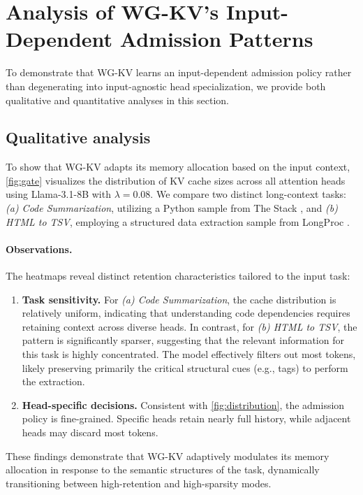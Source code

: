\section{Analysis of WG-KV's Input-Dependent Admission Patterns}
\label{app:dynamic}

To demonstrate that WG-KV learns an input-dependent admission policy rather than degenerating into input-agnostic head specialization, we provide both qualitative and quantitative analyses in this section.

\subsection{Qualitative analysis}
\label{app:qualitative}


To show that WG-KV adapts its memory allocation based on the input context, \cref{fig:gate} visualizes the distribution of KV cache sizes across all attention heads using Llama-3.1-8B with $\lambda=0.08$. We compare two distinct long-context tasks: \textit{(a) Code Summarization}, utilizing a Python sample from The Stack \cite{thestack}, and \textit{(b) HTML to TSV}, employing a structured data extraction sample from LongProc \cite{longproc}.

\paragraph{Observations.} The heatmaps reveal distinct retention characteristics tailored to the input task:
\begin{enumerate}
    \item \textbf{Task sensitivity.} For \textit{(a) Code Summarization}, the cache distribution is relatively uniform, indicating that understanding code dependencies requires retaining context across diverse heads. In contrast, for \textit{(b) HTML to TSV}, the pattern is significantly sparser, suggesting that the relevant information for this task is highly concentrated. The model effectively filters out most tokens, likely preserving primarily the critical structural cues (e.g., tags) to perform the extraction.
    \item \textbf{Head-specific decisions.} Consistent with \cref{fig:distribution}, the admission policy is fine-grained. Specific heads retain nearly full history, while adjacent heads may discard most tokens.
\end{enumerate}

These findings demonstrate that WG-KV adaptively modulates its memory allocation in response to the semantic structures of the task, dynamically transitioning between high-retention and high-sparsity modes.

